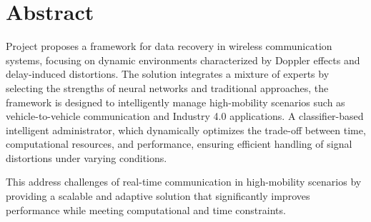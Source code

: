 \section{Abstract}

Project proposes a framework for data recovery in wireless communication systems, focusing on dynamic environments characterized by Doppler effects and delay-induced distortions. The solution integrates a mixture of experts by selecting the strengths of neural networks and traditional approaches, the framework is designed to intelligently manage high-mobility scenarios such as vehicle-to-vehicle communication and Industry 4.0 applications. A classifier-based intelligent administrator, which dynamically optimizes the trade-off between time, computational resources, and performance, ensuring efficient handling of signal distortions under varying conditions.

This address challenges of real-time communication in high-mobility scenarios by providing a scalable and adaptive solution that significantly improves performance while meeting computational and time constraints.
